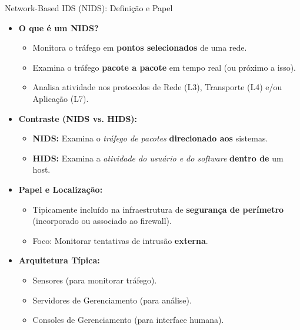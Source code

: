 \begin{frame}{Network-Based IDS (NIDS): Definição e Papel}
    \begin{itemize}
        \item \textbf{O que é um NIDS?}
              \begin{itemize}
                  \item Monitora o tráfego em \textbf{pontos selecionados} de uma rede.
                  \item Examina o tráfego \textbf{pacote a pacote} em tempo real (ou próximo a isso).
                  \item Analisa atividade nos protocolos de Rede (L3), Transporte (L4) e/ou Aplicação (L7).
              \end{itemize}

        \item \textbf{Contraste (NIDS vs. HIDS):}
              \begin{itemize}
                  \item \textbf{NIDS:} Examina o \textit{tráfego de pacotes} \textbf{direcionado aos} sistemas.
                  \item \textbf{HIDS:} Examina a \textit{atividade do usuário e do software} \textbf{dentro de} um host.
              \end{itemize}

        \item \textbf{Papel e Localização:}
              \begin{itemize}
                  \item Tipicamente incluído na infraestrutura de \textbf{segurança de perímetro} (incorporado ou associado ao firewall).
                  \item Foco: Monitorar tentativas de intrusão \textbf{externa}.
              \end{itemize}

        \item \textbf{Arquitetura Típica:}
              \begin{itemize}
                  \item Sensores (para monitorar tráfego).
                  \item Servidores de Gerenciamento (para análise).
                  \item Consoles de Gerenciamento (para interface humana).
              \end{itemize}
    \end{itemize}
\end{frame}

